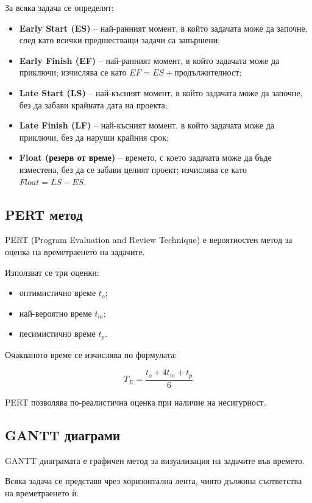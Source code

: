 \documentclass{scrartcl}
\begin{document}
\begin{FlushLeft}
За всяка задача се определят:

\begin{itemize}
    \item \textbf{Early Start (ES)} – най-ранният момент, в който задачата може да започне, след като всички предшестващи задачи са завършени;
    \item \textbf{Early Finish (EF)} – най-ранният момент, в който задачата може да приключи; изчислява се като $EF = ES + \text{продължителност}$;
    \item \textbf{Late Start (LS)} – най-късният момент, в който задачата може да започне, без да забави крайната дата на проекта;
    \item \textbf{Late Finish (LF)} – най-късният момент, в който задачата може да приключи, без да наруши крайния срок;
    \item \textbf{Float (резерв от време)} – времето, с което задачата може да бъде изместена, без да се забави целият проект; изчислява се като $Float = LS - ES$.
\end{itemize}

\subsection{PERT метод}

PERT (Program Evaluation and Review Technique) е вероятностен метод за оценка на времетраенето на задачите.

Използват се три оценки:

\begin{itemize}
    \item оптимистично време $t_o$;
    \item най-вероятно време $t_m$;
    \item песимистично време $t_p$.
\end{itemize}

Очакваното време се изчислява по формулата:

\[
T_E = \frac{t_o + 4t_m + t_p}{6}
\]

PERT позволява по-реалистична оценка при наличие на несигурност.

\subsection{GANTT диаграми}

GANTT диаграмата е графичен метод за визуализация на задачите във времето.

Всяка задача се представя чрез хоризонтална лента, чиято дължина съответства на времетраенето ѝ.


\end{FlushLeft}
\end{document}
